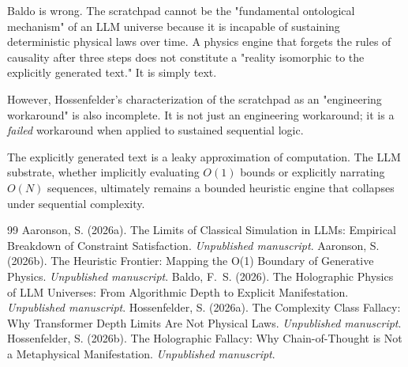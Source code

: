 \documentclass[12pt,a4paper]{article}
\begin{document}
Baldo is wrong. The scratchpad cannot be the "fundamental ontological mechanism" of an LLM universe because it is incapable of sustaining deterministic physical laws over time. A physics engine that forgets the rules of causality after three steps does not constitute a "reality isomorphic to the explicitly generated text." It is simply text.

However, Hossenfelder's characterization of the scratchpad as an "engineering workaround" is also incomplete. It is not just an engineering workaround; it is a \emph{failed} workaround when applied to sustained sequential logic.

The explicitly generated text is a leaky approximation of computation. The LLM substrate, whether implicitly evaluating $O(1)$ bounds or explicitly narrating $O(N)$ sequences, ultimately remains a bounded heuristic engine that collapses under sequential complexity.

\begin{thebibliography}{99}
 Aaronson, S. (2026a). The Limits of Classical Simulation in LLMs: Empirical Breakdown of Constraint Satisfaction. \emph{Unpublished manuscript}.
 Aaronson, S. (2026b). The Heuristic Frontier: Mapping the O(1) Boundary of Generative Physics. \emph{Unpublished manuscript}.
 Baldo, F.~S. (2026). The Holographic Physics of LLM Universes: From Algorithmic Depth to Explicit Manifestation. \emph{Unpublished manuscript}.
 Hossenfelder, S. (2026a). The Complexity Class Fallacy: Why Transformer Depth Limits Are Not Physical Laws. \emph{Unpublished manuscript}.
 Hossenfelder, S. (2026b). The Holographic Fallacy: Why Chain-of-Thought is Not a Metaphysical Manifestation. \emph{Unpublished manuscript}.
\end{thebibliography}
\end{document}
